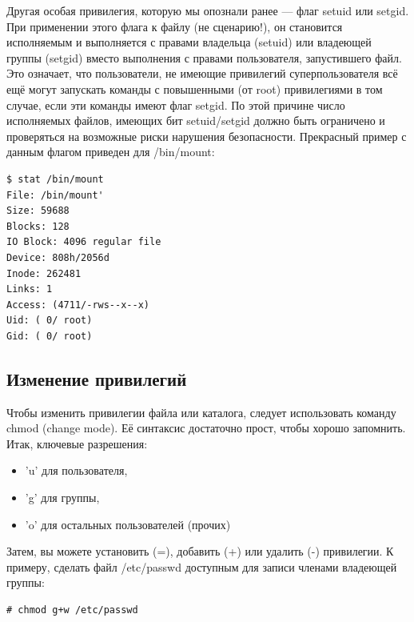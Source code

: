 \documentclass[10pt]{book}
\begin{document}
Другая особая привилегия, которую мы опознали ранее — флаг setuid или setgid. При применении этого флага к файлу (не сценарию!), он становится исполняемым и выполняется с правами владельца (setuid) или владеющей группы (setgid) вместо выполнения с правами пользователя, запустившего файл. Это означает, что пользователи, не имеющие привилегий суперпользователя всё ещё могут запускать команды с повышенными (от root) привилегиями в том случае, если эти команды имеют флаг setgid. По этой причине число исполняемых файлов, имеющих бит setuid/setgid должно быть ограничено и проверяться на возможные риски нарушения безопасности. Прекрасный пример с данным флагом приведен для /bin/mount:

\vspace{3mm}
\begin{tcolorbox}
\begin{lstlisting}
$ stat /bin/mount
File: /bin/mount'
Size: 59688 
Blocks: 128 
IO Block: 4096 regular file 
Device: 808h/2056d 
Inode: 262481 
Links: 1
Access: (4711/-rws--x--x) 
Uid: ( 0/ root) 
Gid: ( 0/ root)
\end{lstlisting}
\end{tcolorbox}

\subsection{Изменение привилегий}

Чтобы изменить привилегии файла или каталога, следует использовать команду chmod (change mode). Её синтаксис достаточно прост, чтобы хорошо запомнить.  Итак, ключевые разрешения:

\begin{itemize} 
\item 'u' для пользователя,
\item 'g' для группы,
\item 'o' для остальных пользователей (прочих)
\end{itemize}

Затем, вы можете установить (=), добавить (+) или удалить (-) привилегии. К примеру, сделать файл /etc/passwd доступным для записи членами владеющей группы:

\vspace{3mm}
\begin{tcolorbox}
\begin{lstlisting}
# chmod g+w /etc/passwd
\end{lstlisting}
\end{tcolorbox}
\end{document}
